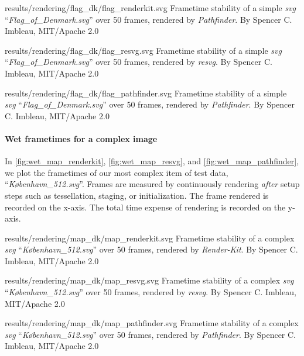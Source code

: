 \widesvg
{results/rendering/flag_dk/flag_renderkit.svg}
{Frametime stability of a simple \textit{svg} ``\textit{Flag\_of\_Denmark.svg}'' over 50 frames, rendered by \textit{Pathfinder}.\label{fig:wet_flag_renderkit}}
{By Spencer C. Imbleau, MIT/Apache 2.0}\medskip

\widesvg
{results/rendering/flag_dk/flag_resvg.svg}
{Frametime stability of a simple \textit{svg} ``\textit{Flag\_of\_Denmark.svg}'' over 50 frames, rendered by \textit{resvg}.\label{fig:wet_flag_resvg}}
{By Spencer C. Imbleau, MIT/Apache 2.0}\medskip

\widesvg
{results/rendering/flag_dk/flag_pathfinder.svg}
{Frametime stability of a simple \textit{svg} ``\textit{Flag\_of\_Denmark.svg}'' over 50 frames, rendered by \textit{Pathfinder}.\label{fig:wet_flag_pathfinder}}
{By Spencer C. Imbleau, MIT/Apache 2.0}


\paragraph{Wet frametimes for a complex image}
In \cref{fig:wet_map_renderkit}, \cref{fig:wet_map_resvg}, and \cref{fig:wet_map_pathfinder}, we plot the frametimes of our most complex item of test data, ``\textit{København\_512.svg}''. Frames are measured by continuously rendering \emph{after} setup steps such as tessellation, staging, or initialization. The frame rendered is recorded on the x-axis. The total time expense of rendering is recorded on the y-axis.\medskip

\widesvg
{results/rendering/map_dk/map_renderkit.svg}
{Frametime stability of a complex \textit{svg} ``\textit{København\_512.svg}'' over 50 frames, rendered by \textit{Render-Kit}.\label{fig:wet_map_renderkit}}
{By Spencer C. Imbleau, MIT/Apache 2.0}\medskip

\widesvg
{results/rendering/map_dk/map_resvg.svg}
{Frametime stability of a complex \textit{svg} ``\textit{København\_512.svg}'' over 50 frames, rendered by \textit{resvg}.\label{fig:wet_map_resvg}}
{By Spencer C. Imbleau, MIT/Apache 2.0}\medskip

\widesvg
{results/rendering/map_dk/map_pathfinder.svg}
{Frametime stability of a complex \textit{svg} ``\textit{København\_512.svg}'' over 50 frames, rendered by \textit{Pathfinder}.\label{fig:wet_map_pathfinder}}
{By Spencer C. Imbleau, MIT/Apache 2.0}\medskip


